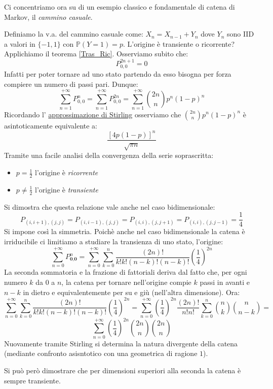 Ci concentriamo ora su di un esempio classico e fondamentale di catena di Markov, il \textit{cammino casuale}.

\begin{example}
Definiamo la v.a. del cammino casuale come: $X_n=X_{n-1}+Y_n$ dove $Y_n$ sono IID a valori in $\{-1,1\}$  con $\mathbb{P}(Y=1)=p$. L'origine è transiente o ricorrente? Applichiamo il teorema \ref{Tras_Ric}. Osserviamo subito che:
\[P_{0,0}^{2n+1}=0\]
Infatti per poter tornare ad uno stato partendo da esso bisogna per forza compiere un numero di passi pari. Dunque:
\[\sum_{n=1}^{+\infty}P_{0,0}^n=\sum_{n=1}^{+\infty}P_{0,0}^{2n}=\sum_{n=1}^{+\infty}\binom{2n}{n}p^n(1-p)^n\]
Ricordando l' \href{https://en.wikipedia.org/wiki/Stirling%27s_approximation}{approssimazione di Stirling}  osserviamo che $\binom{2n}{n}p^n(1-p)^n$ è asintoticamente equivalente a: \[\frac{[4p(1-p)]^n}{\sqrt{\pi n}}\]
Tramite una facile analisi della convergenza della serie soprascritta:
\begin{itemize}
    \item $p=\frac{1}{2}$ l'origine è \textit{ricorrente}
    \item $p\neq\frac{1}{2}$ l'origine è \textit{transiente}
\end{itemize}
Si dimostra che questa relazione vale anche nel caso bidimensionale:
\[P_{(i,i+1),(j,j)}=P_{(i,i-1),(j,j)}=P_{(i,i),(j,j+1)}=P_{(i,i),(j,j-1)}=\frac{1}{4}\]
Si impone così la simmetria. Poichè anche nel caso bidimensionale la catena è irriducibile ci limitiamo a studiare la transienza di uno stato, l'origine:
\[\sum_{n=0}^{+\infty}P_{\textbf{0},\textbf{0}}^n=\sum_{n=0}^{+\infty}\sum_{k=0}^n\frac{(2n)!}{k!k!(n-k)!(n-k)!}\left(\frac{1}{4}\right)^{2n}\]
La seconda sommatoria e la frazione di fattoriali deriva dal fatto che, per ogni numero $k$ da $0$ a $n$, la catena per tornare nell'origine compie $k$ passi in avanti e $n-k$ in dietro e equivalentemente per su e giù (nell'altra dimensione). Ora:
\[\sum_{n=0}^{+\infty}\sum_{k=0}^n\frac{(2n)!}{k!k!(n-k)!(n-k)!}\left(\frac{1}{4}\right)^{2n}=\sum_{n=0}^{+\infty}\left(\frac{1}{4}\right)^{2n}\frac{(2n)!}{n!n!}\sum_{k=0}^n\binom{n}{k}\binom{n}{n-k}=\]
\[\sum_{n=0}^{+\infty}\left(\frac{1}{4}\right)^{2n}\binom{2n}{n}\binom{2n}{n}\]
Nuovamente tramite Stirling si determina la natura divergente della catena (mediante confronto asisntotico con una geometrica di ragione $1$). 

Si può però dimostrare che per dimensioni superiori alla seconda la catena è sempre transiente.
\end{example}

